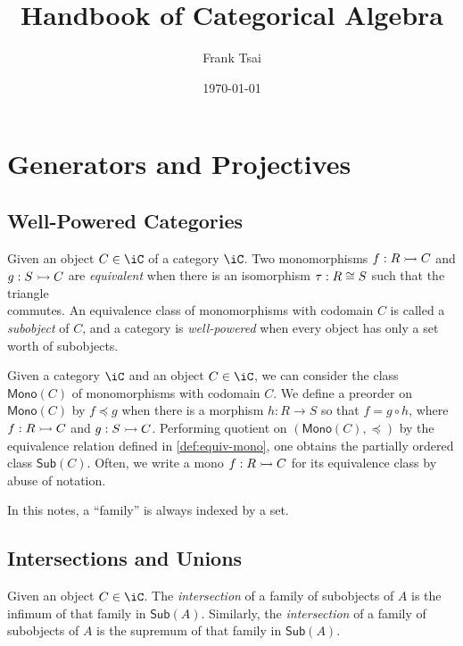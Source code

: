 \documentclass{amsart}
\title{Handbook of Categorical Algebra}
\author{Frank Tsai}
\date{\today}
\begin{document}
\maketitle
\tableofcontents

\section{Generators and Projectives}
\label{sec:generators-and-projectives}

\subsection{Well-Powered Categories}
\label{sec:well-powered-categories}

\begin{defn}\label{def:equiv-mono}
  Given an object $C \in \iC$ of a category $\iC$.
  Two monomorphisms $f : R \rightarrowtail C$ and $g : S \rightarrowtail C$ are \emph{equivalent} when there is an isomorphism $\tau : R \cong S$ such that the triangle
  \[\]
  commutes.
  An equivalence class of monomorphisms with codomain $C$ is called a \emph{subobject} of $C$, and a category is \emph{well-powered} when every object has only a set worth of subobjects.
\end{defn}

Given a category $\iC$ and an object $C \in \iC$, we can consider the class $\mathsf{Mono}(C)$ of monomorphisms with codomain $C$.
We define a preorder on $\mathsf{Mono}(C)$ by $f \preceq g$ when there is a morphism $h : R \to S$ so that $f = g \circ h$, where $f : R \rightarrowtail C$ and $g : S \rightarrowtail C$.
Performing quotient on $(\mathsf{Mono}(C),\preceq)$ by the equivalence relation defined in \cref{def:equiv-mono}, one obtains the partially ordered class $\mathsf{Sub}(C)$.
Often, we write a mono $f : R \rightarrowtail C$ for its equivalence class by abuse of notation.

In this notes, a ``family'' is always indexed by a set.

\subsection{Intersections and Unions}
\label{sec:intersections-and-unions}

\begin{defn}
  Given an object $C \in \iC$.
  The \emph{intersection} of a family of subobjects of $A$ is the infimum of that family in $\mathsf{Sub}(A)$.
  Similarly, the \emph{intersection} of a family of subobjects of $A$ is the supremum of that family in $\mathsf{Sub}(A)$.
\end{defn}
\end{document}
